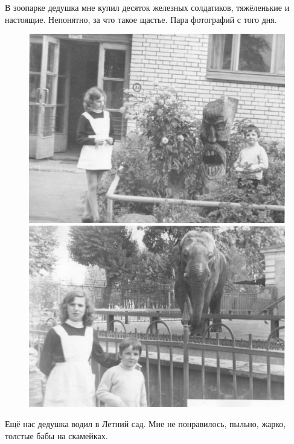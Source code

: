 \documentclass{book}
\begin{document}
В зоопарке дедушка мне купил десяток железных солдатиков, тяжёленькие и настоящие. 
Непонятно, за что такое щастье.
Пара фотографий с того дня.

\begin{figure}[!ht]
\begin{minipage}{.49\textwidth}
\centering
\includegraphics[scale=.5]{pics/lena-tosha-dveri_parkhomenko}
\end{minipage}
\hfill
\begin{minipage}{.49\textwidth}
\centering
\includegraphics[scale=.5]{pics/lena-tosha-zoopark}
\end{minipage}
\end{figure}

Ещё нас дедушка водил в Летний сад.
Мне не понравилось, пыльно, жарко, толстые бабы на скамейках.
\end{document}
